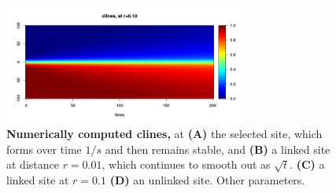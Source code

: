 % 
% 
% 
% 
% 
% 
% 
% 
% 
% 
% 



\begin{figure}
    \begin{center}
       \includegraphics[width=0.7\textwidth]{figs/example_cline}
    \end{center}
    \caption{
        \textbf{Numerically computed clines,} at
        \textbf{(A)} the selected site, which forms over time $1/s$ and then remains stable, and
        \textbf{(B)} a linked site at distance $r=0.01$, which continues to smooth out as $\sqrt{t}$.
        \textbf{(C)} a linked site at $r=0.1$
        \textbf{(D)} an unlinked site.
        Other parameters.
        \label{fig:pde_clines}
    }
\end{figure}


